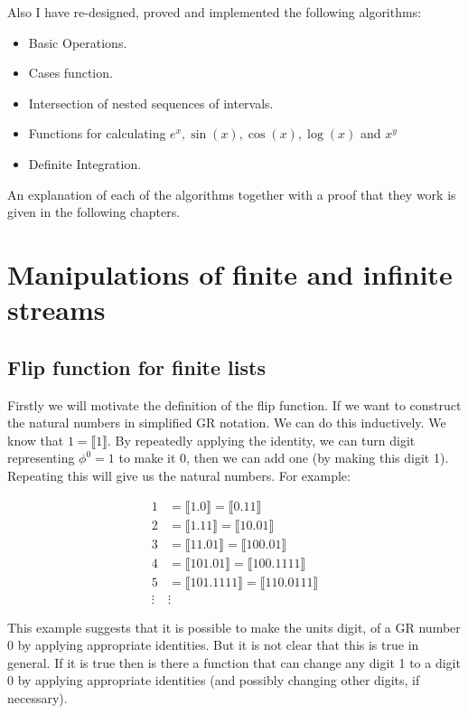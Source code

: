 \documentclass{cs4rep}
\begin{document}
Also I have re-designed, proved and implemented the following
algorithms:
\begin{itemize}
\item Basic Operations.
\item Cases function.
\item Intersection of nested sequences of intervals.
\item Functions for calculating $e^{x}, \sin(x), \cos(x), \log(x)$ and $x^{y}$
\item Definite Integration.
\end{itemize}

An explanation of each of the algorithms together with a proof that
they work is given in the following chapters.

\chapter{Manipulations of finite and infinite streams} \label{ch:mfi}
\section{Flip function for finite lists} \label{sec:flip}

Firstly we will motivate the definition of the flip function. If we
want to construct the natural numbers in simplified GR notation. We
can do this inductively. We know that $1= \llbracket 1 \rrbracket
$. By repeatedly applying the identity, we can turn digit
representing $\phi^{0}=1$ to make it 0, then we can add one (by making
this digit 1). Repeating this will give us the natural numbers. For
example:

\[ \begin{array}{rl}
1 & = \llbracket 1.0 \rrbracket = \llbracket 0.11 \rrbracket \\
2 & = \llbracket 1.11 \rrbracket = \llbracket 10.01 \rrbracket \\
3 & = \llbracket 11.01 \rrbracket = \llbracket 100.01 \rrbracket \\
4 & = \llbracket 101.01 \rrbracket = \llbracket 100.1111 \rrbracket \\
5 & = \llbracket 101.1111 \rrbracket = \llbracket 110.0111 \rrbracket \\
\vdots & \vdots
\end{array} \]

This example suggests that it is possible to make the units digit, of
a GR number 0 by applying appropriate identities. But it is not clear
that this is true in general. If it is true then is there a function
that can change any digit 1 to a digit 0 by applying appropriate identities (and possibly changing other digits, if necessary).
\end{document}
